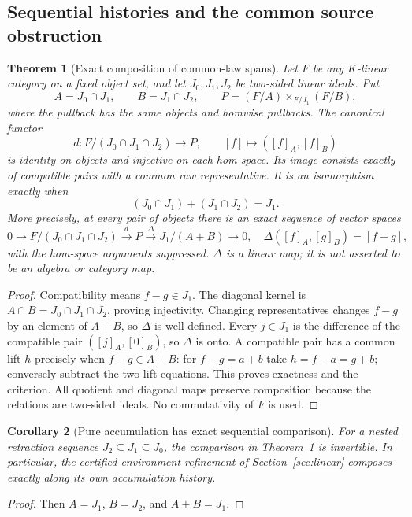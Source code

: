 \documentclass[11pt]{article}
\newtheorem{theorem}{Theorem}[section]
\newtheorem{corollary}[theorem]{Corollary}
\theoremstyle{definition}
\theoremstyle{remark}\newtheorem{remark}[theorem]{Remark}
\begin{document}
\subsection{Sequential histories and the common source obstruction}
\begin{theorem}[Exact composition of common-law spans]\label{thm:history}
Let $F$ be any $K$-linear category on a fixed object set, and let
$J_0,J_1,J_2$ be two-sided linear ideals. Put
\[
 A=J_0\cap J_1,\qquad B=J_1\cap J_2,
 \qquad P=(F/A)\times_{F/J_1}(F/B),
\]
where the pullback has the same objects and homwise pullbacks.
The canonical functor
\[
 d:F/(J_0\cap J_1\cap J_2)\longrightarrow P,
 \qquad [f]\longmapsto([f]_A,[f]_B)
\]
is identity on objects and injective on each hom space. Its image consists
exactly of compatible pairs with a common raw representative. It is an
isomorphism exactly when
\begin{equation}\label{eq:ideal-sum}
       (J_0\cap J_1)+(J_1\cap J_2)=J_1.
\end{equation}
More precisely, at every pair of objects there is an exact sequence of
vector spaces
\[
0\longrightarrow F/(J_0\cap J_1\cap J_2)
 \xrightarrow d P\xrightarrow\Delta J_1/(A+B)\longrightarrow0,
\quad \Delta([f]_A,[g]_B)=[f-g],
\]
with the hom-space arguments suppressed. $\Delta$ is a linear map; it is
not asserted to be an algebra or category map.
\end{theorem}
\begin{proof}
Compatibility means $f-g\in J_1$. The diagonal kernel is
$A\cap B=J_0\cap J_1\cap J_2$, proving injectivity. Changing representatives
changes $f-g$ by an element of $A+B$, so $\Delta$ is well defined.
Every $j\in J_1$ is the difference of the compatible pair $([j]_A,[0]_B)$,
so $\Delta$ is onto. A compatible pair has a common lift $h$ precisely
when $f-g\in A+B$: for $f-g=a+b$ take $h=f-a=g+b$; conversely subtract
the two lift equations. This proves exactness and the criterion.
All quotient and diagonal maps preserve composition because the relations
are two-sided ideals. No commutativity of $F$ is used.
\end{proof}

\begin{corollary}[Pure accumulation has exact sequential comparison]
For a nested retraction sequence $J_2\subseteq J_1\subseteq J_0$,
the comparison in Theorem~\ref{thm:history} is invertible. In particular,
the certified-environment refinement of Section~\ref{sec:linear} composes
exactly along its own accumulation history.
\end{corollary}
\begin{proof}
Then $A=J_1$, $B=J_2$, and $A+B=J_1$.
\end{proof}
\end{document}
